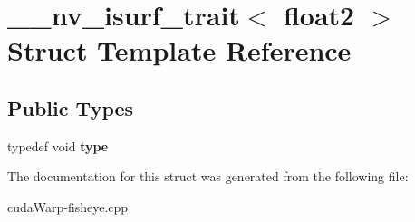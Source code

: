 \hypertarget{struct____nv__isurf__trait_3_01float2_01_4}{}\section{\+\_\+\+\_\+nv\+\_\+isurf\+\_\+trait$<$ float2 $>$ Struct Template Reference}
\label{struct____nv__isurf__trait_3_01float2_01_4}
\subsection*{Public Types}
\begin{DoxyCompactItemize}
\item 
typedef void {\bfseries type}\hypertarget{struct____nv__isurf__trait_3_01float2_01_4_a58bdcb33ffe1fa3d606ac251d83d1c20}{}\label{struct____nv__isurf__trait_3_01float2_01_4_a58bdcb33ffe1fa3d606ac251d83d1c20}

\end{DoxyCompactItemize}


The documentation for this struct was generated from the following file\+:\begin{DoxyCompactItemize}
\item 
cuda\+Warp-\/fisheye.\+cpp\end{DoxyCompactItemize}
